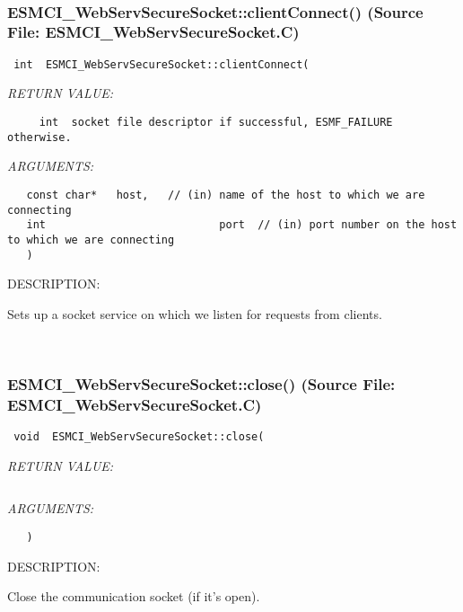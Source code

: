 \mbox{}\hrulefill\
 
\subsubsection{ESMCI\_WebServSecureSocket::clientConnect() (Source File: ESMCI\_WebServSecureSocket.C)}


  
\begin{verbatim} int  ESMCI_WebServSecureSocket::clientConnect(\end{verbatim}{\em RETURN VALUE:}
\begin{verbatim}     int  socket file descriptor if successful, ESMF_FAILURE otherwise.\end{verbatim}{\em ARGUMENTS:}
\begin{verbatim}   const char*   host,   // (in) name of the host to which we are connecting
   int                           port  // (in) port number on the host to which we are connecting
   )\end{verbatim}
{\sf DESCRIPTION:\\ }


      Sets up a socket service on which we listen for requests from clients.
   
 
\mbox{}\hrulefill\
 
\subsubsection{ESMCI\_WebServSecureSocket::close() (Source File: ESMCI\_WebServSecureSocket.C)}


  
\begin{verbatim} void  ESMCI_WebServSecureSocket::close(\end{verbatim}{\em RETURN VALUE:}
\begin{verbatim} \end{verbatim}{\em ARGUMENTS:}
\begin{verbatim}   )\end{verbatim}
{\sf DESCRIPTION:\\ }


      Close the communication socket (if it's open).
   
 
\mbox{}\hrulefill\
 
